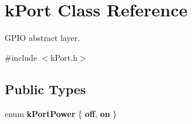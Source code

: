\hypertarget{classkPort}{}\section{k\+Port Class Reference}
\label{classkPort}


G\+P\+IO abstract layer.  




{\ttfamily \#include $<$k\+Port.\+h$>$}

\subsection*{Public Types}
\begin{DoxyCompactItemize}
\item 
enum {\bfseries k\+Port\+Power} \{ {\bfseries off}, 
{\bfseries on}
 \}\hypertarget{classkPort_a57c1bed95e8e3e7887c1f0db558fed7c}{}\label{classkPort_a57c1bed95e8e3e7887c1f0db558fed7c}

\end{DoxyCompactItemize}
